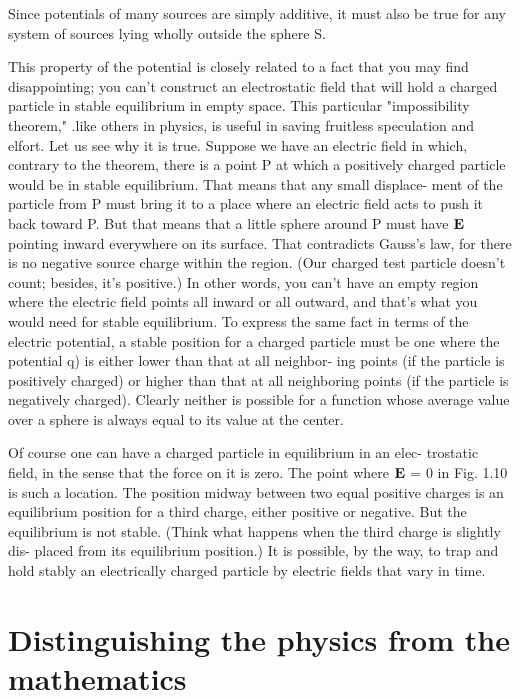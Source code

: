 Since potentials of many sources are simply additive, it must also be
true for any system of sources lying wholly outside the sphere S.

This property of the potential is closely related to a fact that you
may find disappointing; you can't construct an electrostatic field that
will hold a charged particle in stable equilibrium in empty space.
This particular "impossibility theorem," .like others in physics, is
useful in saving fruitless speculation and elfort. Let us see why it
is true. Suppose we have an electric field in which, contrary to the
theorem, there is a point P at which a positively charged particle
would be in stable equilibrium. That means that any small displace-
ment of the particle from P must bring it to a place where an electric
field acts to push it back toward P. But that means that a little sphere
around P must have $\mathbf{E}$ pointing inward everywhere on its surface.
That contradicts Gauss's law, for there is no negative source charge
within the region. (Our charged test particle doesn't count; besides,
it's positive.) In other words, you can't have an empty region where
the electric field points all inward or all outward, and that's what you
would need for stable equilibrium. To express the same fact in terms
of the electric potential, a stable position for a charged particle must
be one where the potential q) is either lower than that at all neighbor-
ing points (if the particle is positively charged) or higher than that
at all neighboring points (if the particle is negatively charged).
Clearly neither is possible for a function whose average value over a
sphere is always equal to its value at the center.

Of course one can have a charged particle in equilibrium in an elec-
trostatic field, in the sense that the force on it is zero. The point
where $\mathbf{E}$ = 0 in Fig. 1.10 is such a location. The position midway
between two equal positive charges is an equilibrium position for a
third charge, either positive or negative. But the equilibrium is not
stable. (Think what happens when the third charge is slightly dis-
placed from its equilibrium position.) It is possible, by the way,
to trap and hold stably an electrically charged particle by electric
fields that vary in time.

\section{Distinguishing the physics from the mathematics}

